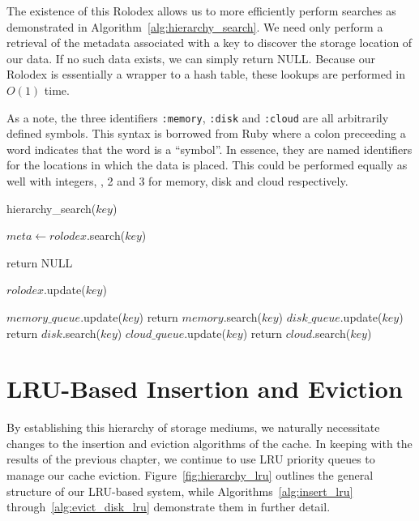 The existence of this Rolodex allows us to more efficiently perform searches as
demonstrated in Algorithm~\ref{alg:hierarchy_search}. We need only perform a
retrieval of the metadata associated with a key to discover the storage
location of our data. If no such data exists, we can simply return NULL\@.
Because our Rolodex is essentially a wrapper to a hash table, these lookups are
performed in $O(1)$ time.

As a note, the three identifiers {\tt :memory}, {\tt :disk} and {\tt :cloud}
are all arbitrarily defined symbols. This syntax is borrowed from Ruby where a
colon preceeding a word indicates that the word is a ``symbol''. In essence,
they are named identifiers for the locations in which the data is placed. This
could be performed equally as well with integers, , 2 and 3 for memory,
disk and cloud respectively.

\begin{algorithm}[htp]
\small
\caption{\label{alg:hierarchy_search}hierarchy\_search($key$)}
\begin{algorithmic}[1]
\STATE $meta \leftarrow rolodex$.search($key$)

  \STATE return NULL
\ENDIF

\STATE $rolodex$.update($key$)

	\STATE $memory\_queue$.update($key$)
	\STATE return $memory$.search($key$)
	\STATE $disk\_queue$.update($key$)
	\STATE return $disk$.search($key$)
	\STATE $cloud\_queue$.update($key$)
	\STATE return $cloud$.search($key$)
\ENDIF
\end{algorithmic}
\end{algorithm}


\section{LRU-Based Insertion and Eviction} %
\label{sec:storage_insertion_eviction}
By establishing this hierarchy of storage mediums, we naturally necessitate
changes to the insertion and eviction algorithms of the cache. In keeping with
the results of the previous chapter, we continue to use LRU priority queues to
manage our cache eviction. Figure~\ref{fig:hierarchy_lru} outlines the general
structure of our LRU-based system, while Algorithms~\ref{alg:insert_lru}
through~\ref{alg:evict_disk_lru} demonstrate them in further detail.

